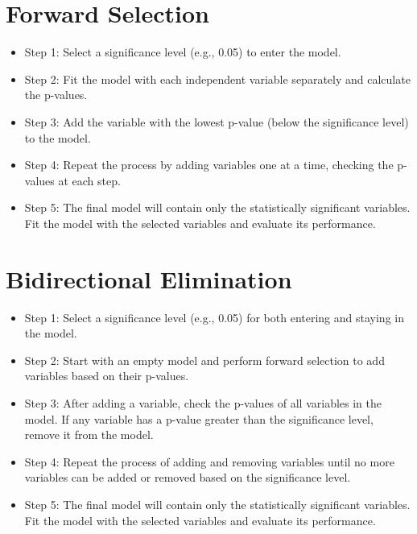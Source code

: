 \documentclass[conference]{IEEEtran}
\begin{document}
\section*{Forward Selection}
\begin{itemize}
    \item Step 1: Select a significance level (e.g., 0.05) to enter the model.
    \item Step 2: Fit the model with each independent variable separately and calculate the p-values.
    \item Step 3: Add the variable with the lowest p-value (below the significance level) to the model.
    \item Step 4: Repeat the process by adding variables one at a time, checking the p-values at each step.
    \item Step 5: The final model will contain only the statistically significant variables. Fit the model with the selected variables and evaluate its performance.
\end{itemize}

\section*{Bidirectional Elimination}
\begin{itemize}
    \item Step 1: Select a significance level (e.g., 0.05) for both entering and staying in the model.
    \item Step 2: Start with an empty model and perform forward selection to add variables based on their p-values.
    \item Step 3: After adding a variable, check the p-values of all variables in the model. If any variable has a p-value greater than the significance level, remove it from the model.
    \item Step 4: Repeat the process of adding and removing variables until no more variables can be added or removed based on the significance level.
    \item Step 5: The final model will contain only the statistically significant variables. Fit the model with the selected variables and evaluate its performance.    
\end{itemize}
\end{document}
